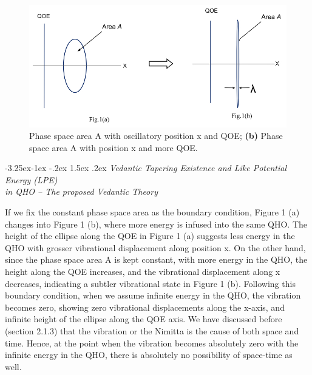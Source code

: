 \documentclass[twoside, 13pt]{article}
\makeatletter
\renewcommand\subsection{\@startsection{subsection}{2}{\z@}%
                                     {-3.25ex\@plus -1ex \@minus -.2ex}%
                                     {1.5ex \@plus .2ex}%
                                     {\normalfont\Large\bfseries}}
\makeatother
\begin{document}
{\begin{figure}[h]
\centering
\includegraphics[scale=.5]{images/001.jpg}
\caption{{\fontsize{10}{12}\selectfont {\bf (a):} Phase space area A with oscillatory position x and QOE; {\bf (b)} Phase space area A with position x and more QOE.}}\label{art1-fig1}
\vspace{-.3cm}

\end{figure}

{\fontsize{8}{10}\selectfont\subsection{\textit{Vedantic Tapering Existence and Like Potential Energy (LPE)\\ in QHO – The proposed Vedantic Theory}}}\label{subsec-3.2}

{\fontsize{12}{14}\selectfont If we fix the constant phase space area as the boundary condition, Figure 1 (a) changes into Figure 1 (b), where more energy is infused into the same QHO. The height of the ellipse along the QOE in Figure 1 (a) suggests less energy in the QHO with grosser vibrational displacement along position x. On the other hand, since the phase space area A is kept constant, with more energy in the QHO, the height along the QOE increases, and the vibrational displacement along x decreases, indicating a subtler vibrational state in Figure  1 (b). Following this boundary condition, when we assume infinite energy in the QHO, the vibration becomes zero, showing zero vibrational displacements along the x-axis, and infinite height of the ellipse along the QOE axis. We have discussed before (section 2.1.3) that the vibration or the Nimitta is the cause of both space and time. Hence, at the point when the vibration becomes absolutely zero with the infinite energy in the QHO, there is absolutely no possibility of space-time as well.

}}
\end{document}
